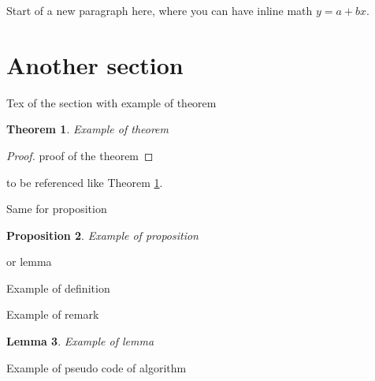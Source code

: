 \documentclass[%
    corpo=11pt,
    twoside,
    stile=classica,
    oldstyle,
    autoretitolo,
    tipotesi=magistrale,
    greek,
    evenboxes,
    english
]{toptesi}
\newtheorem{theorem}{Theorem}[section]
\newtheorem{proposition}[theorem]{Proposition}
\newtheorem{lemma}[theorem]{Lemma}
\begin{document}
Start of a new paragraph here, where you can have inline math $y=a+bx$. 




\section{Another section}

Tex of the section with example of theorem

\begin{theorem}\label{th1}
Example of theorem
\end{theorem}
\begin{proof}
proof of the theorem
\end{proof}

to be referenced like Theorem \ref{th1}. 

Same for proposition
\begin{proposition}
Example of proposition
\end{proposition}
 or lemma
\begin{definition}
Example of definition
\end{definition}

\begin{remark}
Example of remark
\end{remark}

\begin{lemma}
Example of lemma
\end{lemma}






\newpage
Example of pseudo code of algorithm
\end{document}
